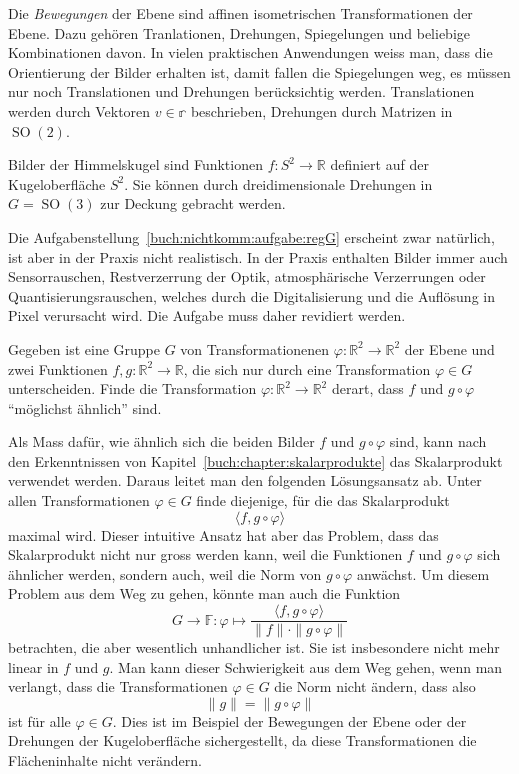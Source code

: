 \begin{beispiel}
Die {\em Bewegungen} der Ebene sind affinen isometrischen
Transformationen der Ebene.
Dazu gehören Tranlationen, Drehungen, Spiegelungen und beliebige
Kombinationen davon.
In vielen praktischen Anwendungen weiss man, dass die Orientierung
der Bilder erhalten ist, damit fallen die Spiegelungen weg, es
müssen nur noch Translationen und Drehungen berücksichtig werden.
Translationen werden durch Vektoren $v\in\mathbb{r}$ beschrieben,
Drehungen durch Matrizen in $\operatorname{SO}(2)$.
\end{beispiel}

\begin{beispiel}
Bilder der Himmelskugel sind Funktionen $f\colon S^2\to\mathbb{R}$
definiert auf der Kugeloberfläche $S^2$.
Sie können durch dreidimensionale Drehungen
in $G=\operatorname{SO}(3)$ zur Deckung gebracht werden.
\end{beispiel}

Die Aufgabenstellung~\ref{buch:nichtkomm:aufgabe:regG}
erscheint zwar natürlich, ist aber in der Praxis
nicht realistisch.
In der Praxis enthalten Bilder immer auch Sensorrauschen, Restverzerrung
der Optik, atmosphärische Verzerrungen oder Quantisierungsrauschen, welches
durch die Digitalisierung und die Auflösung in Pixel verursacht wird.
Die Aufgabe muss daher revidiert werden.

\begin{aufgabe}
\label{buch:nichtkomm:motivation:aufgabe:regGaehnlich}
Gegeben ist eine Gruppe $G$ von Transformationenen
$\varphi:\mathbb{R}^2 \to\mathbb{R}^2$ der Ebene und 
zwei Funktionen $f,g\colon\mathbb{R}^2\to\mathbb{R}$, die sich nur durch
eine Transformation $\varphi\in G$ unterscheiden.
Finde die Transformation $\varphi\colon\mathbb{R}^2\to\mathbb{R}^2$ derart,
dass $f$ und $g\circ \varphi$ ``möglichst ähnlich'' sind.
\end{aufgabe}

Als Mass dafür, wie ähnlich sich die beiden Bilder $f$ und
$g\circ\varphi$ sind, kann nach den Erkenntnissen von
Kapitel~\ref{buch:chapter:skalarprodukte} das Skalarprodukt
verwendet werden.
Daraus leitet man den folgenden Lösungsansatz ab.
Unter allen Transformationen $\varphi\in G$ finde diejenige,
für die das Skalarprodukt
\[
\langle f,g\circ \varphi\rangle
\]
maximal wird.
Dieser intuitive Ansatz hat aber das Problem, dass 
das Skalarprodukt nicht nur gross werden kann, weil die Funktionen
$f$ und $g\circ\varphi$ sich ähnlicher werden, sondern auch,
weil die Norm von $g\circ\varphi$ anwächst.
Um diesem Problem aus dem Weg zu gehen, könnte man auch 
die Funktion
\[
G\to\mathbb{F}
\colon
\varphi\mapsto
\frac{\langle f,g\circ \varphi\rangle}{\|f\|\cdot\|g\circ\varphi\|}
\]
betrachten, die aber wesentlich unhandlicher ist.
Sie ist insbesondere nicht mehr linear in $f$ und $g$.
Man kann dieser Schwierigkeit aus dem Weg gehen, wenn man
verlangt, dass die Transformationen $\varphi\in G$ die Norm nicht
ändern, dass also
\[
\|g\|
=
\|g\circ \varphi\|
\]
ist für alle $\varphi\in G$.
Dies ist im Beispiel der Bewegungen der Ebene oder der Drehungen
der Kugeloberfläche sichergestellt, da diese Transformationen
die Flächeninhalte nicht verändern.

